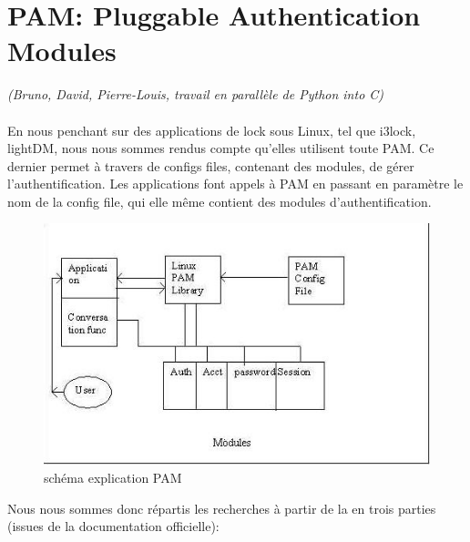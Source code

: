 \documentclass{article}
\begin{document}
  \section{PAM: Pluggable Authentication Modules} \emph{(Bruno, David,
  Pierre-Louis, travail en parallèle de Python into C)}\\ \\
En nous penchant sur des applications de lock sous Linux, tel que i3lock,
lightDM, nous nous sommes rendus compte qu’elles utilisent toute PAM.
Ce dernier permet à travers de configs files, contenant des modules, de
gérer l’authentification. Les applications font appels à PAM en passant en
paramètre le nom de la config file, qui elle même contient des modules
d’authentification.

  \begin{figure}[h]
    \begin{center}
    \includegraphics[width=0.8\linewidth]{./pam}
    \caption{schéma explication PAM}
  \end{center}
  \end{figure}
\newpage
  Nous nous sommes donc répartis les recherches à partir de la en trois parties
  (issues de la documentation officielle):
\end{document}
